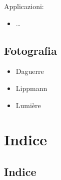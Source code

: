 \documentclass[letterpaper,10pt,italian]{jupyterBook}
\begin{document}
\sphinxAtStartPar
Applicazioni:
\begin{itemize}
\item {} 
\sphinxAtStartPar
…

\end{itemize}

\sphinxstepscope


\chapter{Fotografia}
\label{\detokenize{ch/modern/intro-photography:fotografia}}\label{\detokenize{ch/modern/intro-photography:physics-hs-modern-photography}}\label{\detokenize{ch/modern/intro-photography::doc}}\begin{itemize}
\item {} 
\sphinxAtStartPar
Daguerre

\item {} 
\sphinxAtStartPar
Lippmann

\item {} 
\sphinxAtStartPar
Lumière

\end{itemize}

\sphinxstepscope


\part{Indice}

\sphinxstepscope


\chapter{Indice}
\label{\detokenize{genindex:indice}}\label{\detokenize{genindex::doc}}
\end{document}
